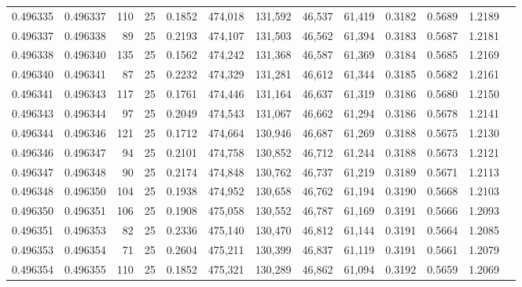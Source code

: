 \begin{tabular}{rrrrrrrrrrrrr}
0.496335 & 0.496337 &   110 &  25 &                                     0.1852 & 474,018 & 131,592 &  46,537 &  61,419 & 0.3182 & 0.5689 & 1.2189 \\
0.496337 & 0.496338 &    89 &  25 &                                     0.2193 & 474,107 & 131,503 &  46,562 &  61,394 & 0.3183 & 0.5687 & 1.2181 \\
0.496338 & 0.496340 &   135 &  25 &                                     0.1562 & 474,242 & 131,368 &  46,587 &  61,369 & 0.3184 & 0.5685 & 1.2169 \\
0.496340 & 0.496341 &    87 &  25 &                                     0.2232 & 474,329 & 131,281 &  46,612 &  61,344 & 0.3185 & 0.5682 & 1.2161 \\
0.496341 & 0.496343 &   117 &  25 &                                     0.1761 & 474,446 & 131,164 &  46,637 &  61,319 & 0.3186 & 0.5680 & 1.2150 \\
0.496343 & 0.496344 &    97 &  25 &                                     0.2049 & 474,543 & 131,067 &  46,662 &  61,294 & 0.3186 & 0.5678 & 1.2141 \\
0.496344 & 0.496346 &   121 &  25 &                                     0.1712 & 474,664 & 130,946 &  46,687 &  61,269 & 0.3188 & 0.5675 & 1.2130 \\
0.496346 & 0.496347 &    94 &  25 &                                     0.2101 & 474,758 & 130,852 &  46,712 &  61,244 & 0.3188 & 0.5673 & 1.2121 \\
0.496347 & 0.496348 &    90 &  25 &                                     0.2174 & 474,848 & 130,762 &  46,737 &  61,219 & 0.3189 & 0.5671 & 1.2113 \\
0.496348 & 0.496350 &   104 &  25 &                                     0.1938 & 474,952 & 130,658 &  46,762 &  61,194 & 0.3190 & 0.5668 & 1.2103 \\
0.496350 & 0.496351 &   106 &  25 &                                     0.1908 & 475,058 & 130,552 &  46,787 &  61,169 & 0.3191 & 0.5666 & 1.2093 \\
0.496351 & 0.496353 &    82 &  25 &                                     0.2336 & 475,140 & 130,470 &  46,812 &  61,144 & 0.3191 & 0.5664 & 1.2085 \\
0.496353 & 0.496354 &    71 &  25 &                                     0.2604 & 475,211 & 130,399 &  46,837 &  61,119 & 0.3191 & 0.5661 & 1.2079 \\
0.496354 & 0.496355 &   110 &  25 &                                     0.1852 & 475,321 & 130,289 &  46,862 &  61,094 & 0.3192 & 0.5659 & 1.2069 \\

\end{tabular}
